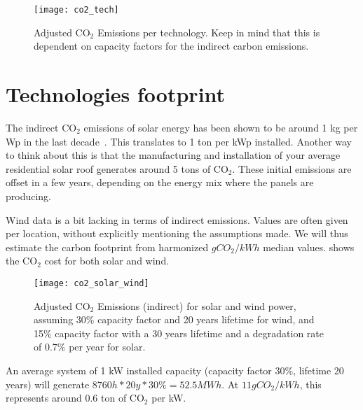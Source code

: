 \begin{figure}[h]
	\texttt{[image: co2\_tech]}
	\caption[Adjusted $\mathrm{CO_2}$ Emissions per technology. Keep in mind that this is dependent on capacity factors for the indirect carbon emissions.]{Adjusted $\mathrm{CO_2}$ Emissions per technology. Keep in mind that this is dependent on capacity factors for the indirect carbon emissions.}
\end{figure}



\section{Technologies footprint}

The indirect $\mathrm{CO_2}$ emissions of solar energy has been shown to be around 1 kg per Wp in the last decade~. This translates to 1 ton per kWp installed. Another way to think about this is that the manufacturing and installation of your average residential solar roof generates around 5 tons of $\mathrm{CO_2}$. These initial emissions are offset in a few years, depending on the energy mix where the panels are producing.

Wind data is a bit lacking in terms of indirect emissions. Values are often given per location, without explicitly mentioning the assumptions made. We will thus estimate the carbon footprint from harmonized $gCO_2/kWh$ median values.  shows the $\mathrm{CO_2}$ cost for both solar and wind.


\begin{figure}[h]
	\texttt{[image: co2\_solar\_wind]}
	\caption[Adjusted $\mathrm{CO_2}$ Emissions (indirect) for solar and wind power, assuming 30\% capacity factor and 20 years lifetime for wind, and 15\% capacity factor with a 30 years lifetime and a degradation rate of 0.7\% per year for solar.]{Adjusted $\mathrm{CO_2}$ Emissions (indirect) for solar and wind power, assuming 30\% capacity factor and 20 years lifetime for wind, and 15\% capacity factor with a 30 years lifetime and a degradation rate of 0.7\% per year for solar.}
\end{figure}

An average system of 1 kW installed capacity (capacity factor 30\%, lifetime 20 years) will generate $8760h * 20y * 30\% = 52.5 MWh$. At $11 gCO_2/kWh$, this represents around 0.6 ton of $\mathrm{CO_2}$ per kW.

